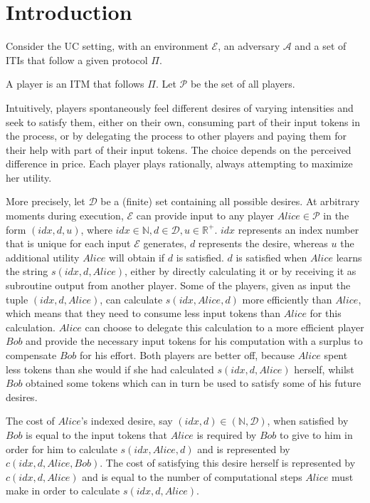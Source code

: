 \section{Introduction}
  Consider the UC setting, with an environment $\mathcal{E}$, an adversary $\mathcal{A}$ and a set of ITIs that follow a
  given protocol $\Pi$.

  \begin{definition}[Player]
    A player is an ITM that follows $\Pi$. Let $\mathcal{P}$ be the set of all players.
  \end{definition}

  Intuitively, players spontaneously feel different desires of varying intensities and seek to satisfy them, either on their
  own, consuming part of their input tokens in the process, or by delegating the process to other players and paying them for
  their help with part of their input tokens. The choice depends on the perceived difference in price. Each player plays
  rationally, always attempting to maximize her utility.
  
  More precisely, let $\mathcal{D}$ be a (finite) set containing all possible desires. At arbitrary moments during execution,
  $\mathcal{E}$ can provide input to any player $Alice \in \mathcal{P}$ in the form $\left(idx, d, u\right)$, where $idx \in
  \mathbb{N}, d \in \mathcal{D}, u \in \mathbb{R}^{+}$. $idx$ represents an index number that is unique for each input
  $\mathcal{E}$ generates, $d$ represents the desire, whereas $u$ the additional utility $Alice$ will obtain if $d$ is
  satisfied. $d$ is satisfied when $Alice$ learns the string $s\left(idx, d, Alice\right)$, either by directly calculating it
  or by receiving it as subroutine output from another player. Some of the players, given as input the tuple $\left(idx, d,
  Alice\right)$, can calculate $s\left(idx, Alice, d\right)$ more efficiently than $Alice$, which means that they need to
  consume less input tokens than $Alice$ for this calculation. $Alice$ can choose to delegate this calculation to a more
  efficient player $Bob$ and provide the necessary input tokens for his computation with a surplus to compensate $Bob$ for his
  effort. Both players are better off, because $Alice$ spent less tokens than she would if she had calculated $s\left(idx, d,
  Alice\right)$ herself, whilst $Bob$ obtained some tokens which can in turn be used to satisfy some of his future desires.

  \begin{definition}
    The cost of $Alice$'s indexed desire, say $\left(idx, d\right) \in \left(\mathbb{N}, \mathcal{D}\right)$, when satisfied by
    $Bob$ is equal to the input tokens that $Alice$ is required by $Bob$ to give to him in order for him to calculate
    $s\left(idx, Alice, d\right)$ and is represented by $c\left(idx, d, Alice, Bob\right)$. The cost of satisfying this desire
    herself is represented by $c\left(idx, d, Alice\right)$ and is equal to the number of computational steps $Alice$ must make
    in order to calculate $s\left(idx, d, Alice\right)$.
  \end{definition}

